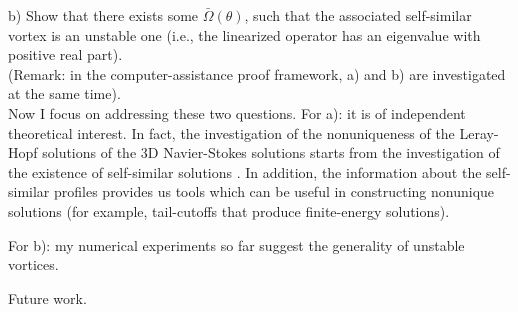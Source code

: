 \documentclass{article}
\numberwithin{equation}{section}
\begin{document}
b) Show that there exists some $\bar\Omega(\theta)$, such that the associated self-similar vortex is an unstable one (i.e., the linearized operator has an eigenvalue with positive real part).\\
(Remark: in the computer-assistance proof framework, a) and b) are investigated at the same time).\\
Now I focus on addressing these two questions.
For a): it is of independent theoretical interest. In fact, the investigation of the nonuniqueness of the Leray-Hopf solutions of the $3$D Navier-Stokes solutions starts from the investigation of the existence of self-similar solutions \cite{JiaSverak_Invention}. In addition, the information about the self-similar profiles provides us tools which can be useful in constructing nonunique solutions (for example, tail-cutoffs that produce finite-energy solutions).

For b): my numerical experiments so far suggest the generality of unstable vortices. 

Future work.
\end{document}
